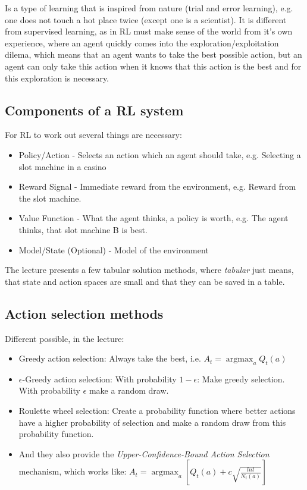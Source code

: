 \documentclass[12pt,a4paper]{article}
\DeclareMathOperator*{\argmax}{argmax}
\begin{document}
\noindent Is a type of learning that is inspired from nature (trial and error learning), e.g. one does not touch a hot place twice (except one is a scientist). It is different from supervised learning, as in RL must make sense of the world from it's own experience, where an agent quickly comes into the exploration/exploitation dilema, which means that an agent wants to take the best possible action, but an agent can only take this action when it knows that this action is the best and for this exploration is necessary.\\

\subsection{Components of a RL system}

For RL to work out several things are necessary:
\begin{itemize}
    \item Policy/Action - Selects an action which an agent should take, e.g. Selecting a slot machine in a casino
    \item Reward Signal - Immediate reward from the environment, e.g. Reward from the slot machine.
    \item Value Function - What the agent thinks, a policy is worth, e.g. The agent thinks, that slot machine B is best.
    \item Model/State (Optional) - Model of the environment 
\end{itemize}

\noindent The lecture presents a few tabular solution methods, where \textit{tabular} just means, that state and action spaces are small and that they can be saved in a table.\\

\subsection{Action selection methods}

\noindent Different possible, in the lecture:

\begin{itemize}
    \item Greedy action selection: Always take the best, i.e. \(A_t = \argmax_a Q_t(a)\)
    \item \(\epsilon\)-Greedy action selection: With probability \(1 - \epsilon\): Make greedy selection. With probability \(\epsilon\) make a random draw.
    \item Roulette wheel selection: Create a probability function where better actions have a higher probability of selection and make a random draw from this probability function.
    \item And they also provide the \textit{Upper-Confidence-Bound Action Selection} mechanism, which works like: \(A_t = \argmax_a \left[ Q_t(a) + c \sqrt{\frac{ln t}{N_t(a)}} \right] \)
\end{itemize}
\end{document}
